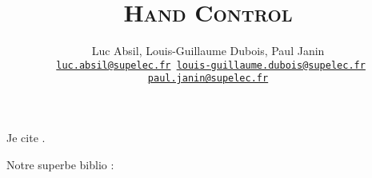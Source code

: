 \documentclass[fontsize=14pt, DIV=calc, a4paper]{scrartcl}
\title{\textsc{Hand Control}\\
\Huge \textbf{}}
\author{Luc Absil, Louis-Guillaume Dubois, Paul Janin\\
\bigskip
{\tt \small
\href{mailto:luc.absil@supelec.fr}{luc.absil@supelec.fr}
\href{mailto:louis-guillaume.dubois@supelec.fr}{louis-guillaume.dubois@supelec.fr}
\href{mailto:paul.janin@supelec.fr}{paul.janin@supelec.fr}}}
\date{}
\begin{document}
\maketitle

Je cite \cite{blagues}.

Notre superbe biblio :
 
\end{document}
